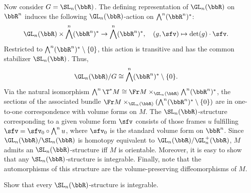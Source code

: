 \begin{example}
    Now consider $G=\SL_n(\bbR)$. The defining representation of $\GL_n(\bbR)$ on $\bbR^n$ induces the following $\GL_n(\bbR)$-action on $\bigwedge^n(\bbR^n)^\ast$: 
    \[\GL_n(\bbR)\times \bigwedge^n(\bbR^n)^\ast\to  \bigwedge^n(\bbR^n)^\ast,\quad (g,\sfv)\mapsto \det(g)\cdot\sfv.\]
    Restricted to $\bigwedge^n(\bbR^n)^\ast\setminus\{0\}$, this action is transitive and has the common stabilizer $\SL_n(\bbR)$. Thus, 
    \[\GL_n(\bbR)\slash G\cong \bigwedge^n(\bbR^n)^\ast\setminus\{0\}.\]
    Via the natural isomorphism $\bigwedge^n \T^\ast M\cong \Fr M\times_{\GL_n(\bbR)}\bigwedge^n(\bbR^n)^\ast$, the sections of the associated bundle $\Fr M\times_{\GL_n(\bbR)} \left(\bigwedge^n(\bbR^n)^\ast\setminus\{0\}\right)$ are in one-to-one correspondence with volume forms on $M$. The $\SL_n(\bbR)$-structure corresponding to a given volume form $\sfv$ consists of those frames $u$ fulfilling $\sfv=\sfv_0\circ \bigwedge^n u$, where $\sfv_0$ is the standard volume form on $\bbR^n$. Since $\GL_n(\bbR)\slash\SL_n(\bbR)$ is homotopy equivalent to $\GL_n(\bbR)\slash \GL_n^+(\bbR)$, $M$ admits an $\SL_n(\bbR)$-structure iff $M$ is orientable. Moreover, it is easy to show that any $\SL_n(\bbR)$-structure is integrable. Finally, note that the automorphisms of this structure are the volume-preserving diffeomorphisms of $M$.
\end{example}
\begin{xca}
    Show that every $\SL_n(\bbR)$-structure is integrable.
\end{xca}


